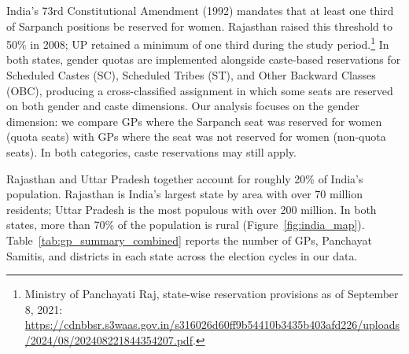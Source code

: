 \documentclass[12pt]{article}
\begin{document}
India's 73rd Constitutional Amendment (1992) mandates that at least one third of Sarpanch positions be reserved for women. Rajasthan raised this threshold to 50\% in 2008; UP retained a minimum of one third during the study period.\footnote{Ministry of Panchayati Raj, state-wise reservation provisions as of September 8, 2021: \url{https://cdnbbsr.s3waas.gov.in/s316026d60ff9b54410b3435b403afd226/uploads/2024/08/202408221844354207.pdf}.} In both states, gender quotas are implemented alongside caste-based reservations for Scheduled Castes (SC), Scheduled Tribes (ST), and Other Backward Classes (OBC), producing a cross-classified assignment in which some seats are reserved on both gender and caste dimensions. Our analysis focuses on the gender dimension: we compare GPs where the Sarpanch seat was reserved for women (quota seats) with GPs where the seat was not reserved for women (non-quota seats). In both categories, caste reservations may still apply.

Rajasthan and Uttar Pradesh together account for roughly 20\% of India's population. Rajasthan is India's largest state by area with over 70 million residents; Uttar Pradesh is the most populous with over 200 million. In both states, more than 70\% of the population is rural (Figure~\ref{fig:india_map}). Table~\ref{tab:gp_summary_combined} reports the number of GPs, Panchayat Samitis, and districts in each state across the election cycles in our data.
\end{document}
